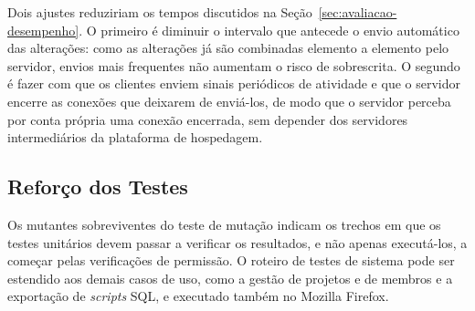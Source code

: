 Dois ajustes reduziriam os tempos discutidos na Seção~\ref{sec:avaliacao-desempenho}. O primeiro é diminuir o intervalo que antecede o envio automático das alterações: como as alterações já são combinadas elemento a elemento pelo servidor, envios mais frequentes não aumentam o risco de sobrescrita. O segundo é fazer com que os clientes enviem sinais periódicos de atividade e que o servidor encerre as conexões que deixarem de enviá-los, de modo que o servidor perceba por conta própria uma conexão encerrada, sem depender dos servidores intermediários da plataforma de hospedagem.

\subsection{Reforço dos Testes}

Os mutantes sobreviventes do teste de mutação indicam os trechos em que os testes unitários devem passar a verificar os resultados, e não apenas executá-los, a começar pelas verificações de permissão. O roteiro de testes de sistema pode ser estendido aos demais casos de uso, como a gestão de projetos e de membros e a exportação de \textit{scripts} SQL, e executado também no Mozilla Firefox.
